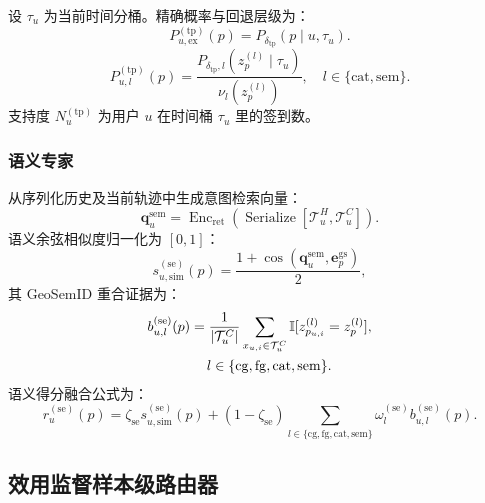 \documentclass[10pt,fontset=none,twocolumn]{ctexart}
\newcommand{\Ind}{\mathbb{I}}
\begin{document}
设 $\tau_u$ 为当前时间分桶。精确概率与回退层级为：
\begin{equation}
P_{u,\mathrm{ex}}^{(\mathrm{tp})}(p)
=
P_{\delta_{\mathrm{tp}}}(p\mid u,\tau_u).
\label{eq:temporal_exact}
\end{equation}
\begin{equation}
P_{u,l}^{(\mathrm{tp})}(p)
=
\frac{P_{\delta_{\mathrm{tp}},l}(z_p^{(l)}\mid\tau_u)}
{\nu_l(z_p^{(l)})},
\quad
l\in\{\mathrm{cat},\mathrm{sem}\}.
\label{eq:temporal_backoff}
\end{equation}
支持度 $N_u^{(\mathrm{tp})}$ 为用户 $u$ 在时间桶 $\tau_u$ 里的签到数。

\subsubsection{语义专家}

从序列化历史及当前轨迹中生成意图检索向量：
\begin{equation}
\bm{q}_{u}^{\mathrm{sem}}
=
\operatorname{Enc}_{\mathrm{ret}}
\left(
\operatorname{Serialize}
\left[\mathcal{T}_{u}^{H},\mathcal{T}_{u}^{C}\right]
\right).
\label{eq:semantic_query}
\end{equation}
语义余弦相似度归一化为 $[0,1]$：
\begin{equation}
s_{u,\mathrm{sim}}^{(\mathrm{se})}(p)
=
\frac{1+\operatorname{cos}\!\left(
\bm{q}_{u}^{\mathrm{sem}},\bm{e}_{p}^{\mathrm{gs}}
\right)}{2},
\label{eq:semantic_exact}
\end{equation}
其 GeoSemID 重合证据为：
\begin{equation}
\begin{aligned}
b_{u,l}^{(\mathrm{se})}(p)
&=
\frac{1}{|\mathcal{T}_{u}^{C}|}
\sum_{x_{u,i}\in\mathcal{T}_{u}^{C}}
\Ind[z_{p_{u,i}}^{(l)}=z_p^{(l)}],\\
&\hspace{1.2em}
 l\in\{\mathrm{cg},\mathrm{fg},\mathrm{cat},\mathrm{sem}\}.
\end{aligned}
\label{eq:semantic_backoff}
\end{equation}
语义得分融合公式为：
\begin{equation}
r_u^{(\mathrm{se})}(p)
=
\zeta_{\mathrm{se}}s_{u,\mathrm{sim}}^{(\mathrm{se})}(p)
+
(1-\zeta_{\mathrm{se}})
\sum_{l\in\{\mathrm{cg},\mathrm{fg},\mathrm{cat},\mathrm{sem}\}}
\omega_l^{(\mathrm{se})}b_{u,l}^{(\mathrm{se})}(p).
\label{eq:semantic_fusion}
\end{equation}

\subsection{效用监督样本级路由器}
\label{subsec:router}
\end{document}
